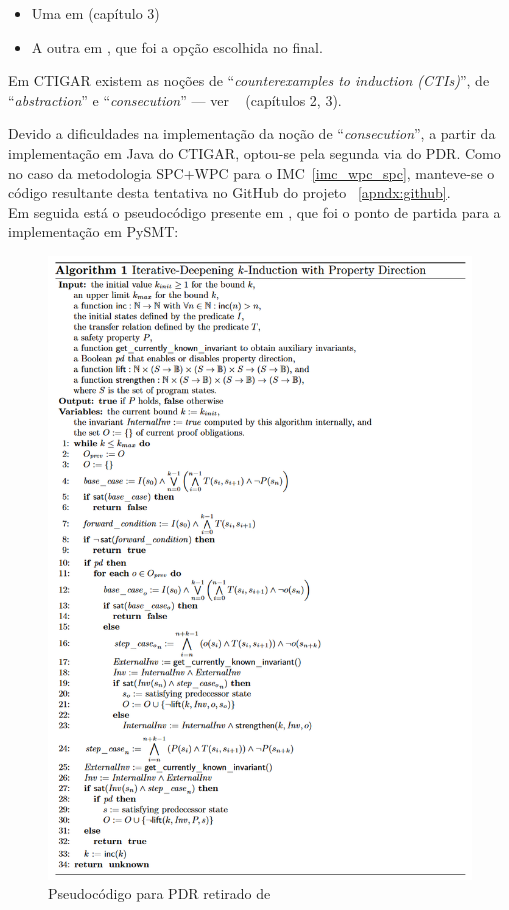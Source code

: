 \documentclass[11pt,a4paper]{report}%
\begin{document}
\begin{itemize}
    \item Uma em \cite{ctigar} (capítulo 3)
    \item A outra em \cite{pdr_state_of_art}, que foi a opção escolhida no final.
\end{itemize}

Em CTIGAR existem as noções de ``\textit{counterexamples to induction (CTIs)}'',
de ``\textit{abstraction}'' e ``\textit{consecution}'' --- ver ~\cite{ctigar}
(capítulos 2, 3).

Devido a dificuldades na implementação da noção de ``\textit{consecution}'', a partir da
implementação em Java do CTIGAR, optou-se pela segunda via do PDR.
Como no caso da metodologia SPC+WPC para o IMC~\ref{imc_wpc_spc}, manteve-se o código
resultante desta tentativa no GitHub do projeto ~\ref{apndx:github}.\\

Em seguida está o pseudocódigo presente em \cite{pdr_state_of_art}, que foi o ponto
de partida para a implementação em PySMT:

\begin{figure}[H]
      \centering
      \includegraphics[scale=0.75]{pdr-pseudocode.png}
      \caption{Pseudocódigo para PDR retirado de \cite{pdr_state_of_art}}
      \label{fig:pdrpseudo}
\end{figure}
\end{document}
